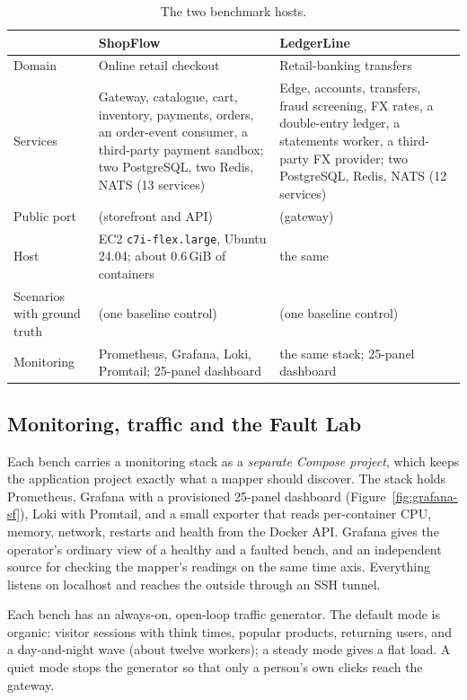 \begin{table}[!htbp]
\centering
\caption{The two benchmark hosts.}
\label{tab:benches}
\small
\renewcommand{\arraystretch}{1.2}
\begin{tabularx}{\textwidth}{>{\raggedright\arraybackslash}p{3.2cm}>{\raggedright\arraybackslash}X>{\raggedright\arraybackslash}X}
\toprule
 & \textbf{ShopFlow} & \textbf{LedgerLine}\\
\midrule
Domain & Online retail checkout & Retail-banking transfers\\
Services & Gateway, catalogue, cart, inventory, payments, orders, an order-event consumer, a third-party payment sandbox; two PostgreSQL, two Redis, NATS (13 services) & Edge, accounts, transfers, fraud screening, FX rates, a double-entry ledger, a statements worker, a third-party FX provider; two PostgreSQL, Redis, NATS (12 services)\\
Public port & 8080 (storefront and API) & 8081 (gateway)\\
Host & EC2 \texttt{c7i-flex.large}, Ubuntu 24.04; about 0.6\,GiB of containers & the same\\
Scenarios with ground truth & 12 (one baseline control) & 7 (one baseline control)\\
Monitoring & Prometheus, Grafana, Loki, Promtail; 25-panel dashboard & the same stack; 25-panel dashboard\\
\bottomrule
\end{tabularx}
\end{table}

\subsection{Monitoring, traffic and the Fault Lab}
Each bench carries a monitoring stack as a \emph{separate Compose project}, which keeps the application project exactly what a mapper should discover. The stack holds Prometheus, Grafana with a provisioned 25-panel dashboard (Figure~\ref{fig:grafana-sf}), Loki with Promtail, and a small exporter that reads per-container CPU, memory, network, restarts and health from the Docker API. Grafana gives the operator's ordinary view of a healthy and a faulted bench, and an independent source for checking the mapper's readings on the same time axis. Everything listens on localhost and reaches the outside through an SSH tunnel.

Each bench has an always-on, open-loop traffic generator. The default mode is organic: visitor sessions with think times, popular products, returning users, and a day-and-night wave (about twelve workers); a steady mode gives a flat load. A quiet mode stops the generator so that only a person's own clicks reach the gateway.

